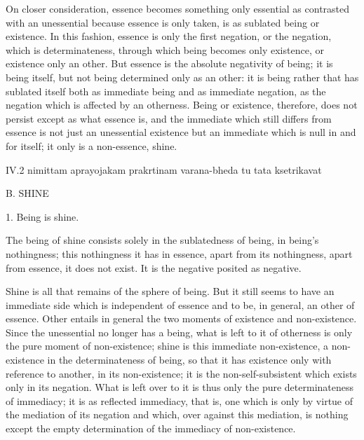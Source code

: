 On closer consideration, essence becomes something
only essential as contrasted with an unessential
because essence is only taken,
is as sublated being or existence.
In this fashion, essence is only the first negation,
or the negation, which is determinateness,
through which being becomes only existence,
or existence only an other.
But essence is the absolute negativity of being;
it is being itself, but not being determined only as an other:
it is being rather that has sublated itself
both as immediate being
and as immediate negation,
as the negation which is affected by an otherness.
Being or existence, therefore, does not persist
except as what essence is,
and the immediate which still differs from essence is not just
an unessential existence but an immediate
which is null in and for itself;
it only is a non-essence, shine.

IV.2
nimittam aprayojakam prakrtinam varana-bheda tu tata ksetrikavat

B. SHINE

1. Being is shine.

The being of shine consists solely
in the sublatedness of being,
in being's nothingness;
this nothingness it has in essence,
apart from its nothingness,
apart from essence, it does not exist.
It is the negative posited as negative.

Shine is all that remains of the sphere of being.
But it still seems to have an immediate side
which is independent of essence
and to be, in general, an other of essence.
Other entails in general the two moments
of existence and non-existence.
Since the unessential no longer has a being,
what is left to it of otherness is
only the pure moment of non-existence;
shine is this immediate non-existence,
a non-existence in the determinateness of being,
so that it has existence only with reference to another,
in its non-existence;
it is the non-self-subsistent
which exists only in its negation.
What is left over to it is thus only
the pure determinateness of immediacy;
it is as reflected immediacy, that is,
one which is only by virtue of
the mediation of its negation
and which, over against this mediation, is
nothing except the empty determination
of the immediacy of non-existence.

